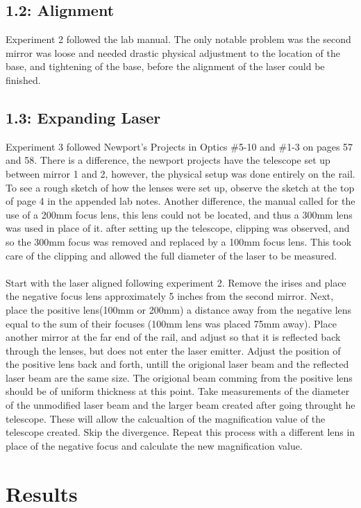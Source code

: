 \documentclass[a4paper,12pt]{article}
\begin{document}
\subsection*{1.2: Alignment}
Experiment 2 followed the lab manual.  The only notable problem was the second mirror was loose and needed drastic physical adjustment to the location of the base, and tightening of the base, before the alignment of the laser could be finished.

\subsection*{1.3: Expanding Laser}
Experiment 3 followed Newport's Projects in Optics \#5-10 and \#1-3 on pages 57 and 58.  There is a difference, the newport projects have the telescope set up between mirror 1 and 2, however, the physical setup was done entirely on the rail.  To see a rough sketch of how the lenses were set up, observe the sketch at the top of page 4 in the appended lab notes.  Another difference, the manual called for the use of a 200mm focus lens, this lens could not be located, and thus a 300mm lens was used in place of it.  after setting up the telescope, clipping was observed, and so the 300mm focus was removed and replaced by a 100mm focus lens.  This took care of the clipping and allowed the full diameter of the laser to be measured.\\
\\
Start with the laser aligned following experiment 2.  Remove the irises and place the negative focus lens approximately 5 inches from the second mirror.  Next, place the positive lens(100mm or 200mm) a distance away from the negative lens equal to the sum of their focuses (100mm lens was placed 75mm away).  Place another mirror at the far end of the rail, and adjust so that it is reflected back through the lenses, but does not enter the laser emitter.  Adjust the position of the positive lens back and forth, untill the origional laser beam and the reflected laser beam are the same size.  The origional beam comming from the positive lens should be of uniform thickness at this point.  Take measurements of the diameter of the unmodified laser beam and the larger beam created after going throught he telescope.  These will allow the calcualtion of the magnification value of the telescope created.  Skip the divergence. Repeat this process with a different lens in place of the negative focus and calculate the new magnification value.
\section*{Results}
\end{document}
